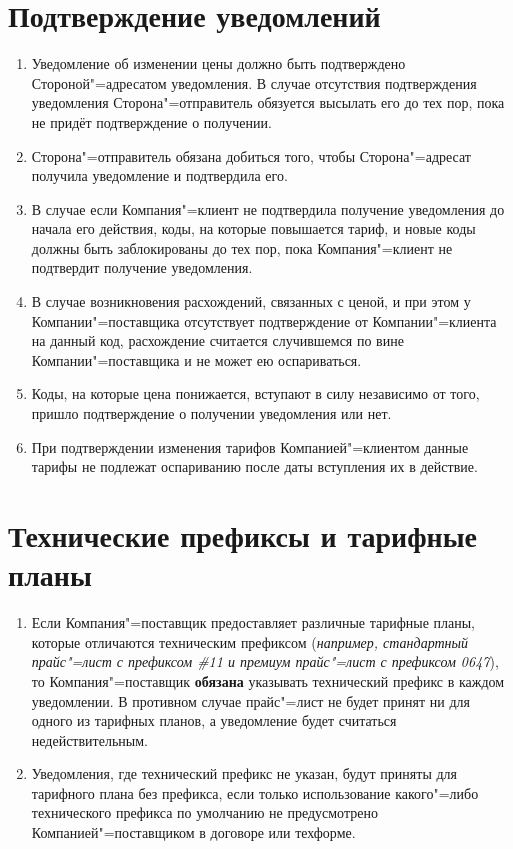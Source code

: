 \begin{Form}
\section{Подтверждение уведомлений} \label{sec:confirmation-ru}
  \begin{enumerate}[label=\thesection.\arabic*.]
   \item Уведомление об изменении цены должно быть подтверждено Стороной"=адресатом уведомления.
         В случае отсутствия подтверждения уведомления Сторона"=отправитель обязуется высылать его
         до тех пор, пока не придёт подтверждение о получении.
    \item  Сторона"=отправитель обязана добиться того, чтобы Сторона"=адресат получила уведомление
           и подтвердила его.
    \item В случае если Компания"=клиент не подтвердила получение уведомления до начала его действия,
          коды, на которые повышается тариф, и новые коды должны быть заблокированы до тех пор,
          пока Компания"=клиент не подтвердит получение уведомления.
    \item В случае возникновения расхождений, связанных с ценой, и при этом у Компании"=поставщика
          отсутствует подтверждение от Компании"=клиента на данный код, расхождение считается
          случившемся по вине Компании"=поставщика и не может ею оспариваться.
    \item Коды, на которые цена понижается, вступают в силу независимо от того, пришло подтверждение
          о получении уведомления или нет.
    \item При подтверждении изменения тарифов Компанией"=клиентом данные тарифы не подлежат оспариванию
          после даты вступления их в действие.
  \end{enumerate}

\section{Технические префиксы и тарифные планы}

  \begin{enumerate}[label=\thesection.\arabic*.]
    \item Если Компания"=поставщик предоставляет различные тарифные планы,
          которые отличаются техническим префиксом (\textit{например, стандартный прайс"=лист
          с префиксом \#11 и премиум прайс"=лист с префиксом 0647}), то Компания"=поставщик
          \textbf{обязана} указывать технический префикс в
          каждом уведомлении. В противном случае прайс"=лист не будет принят ни
          для одного из тарифных планов, а уведомление будет считаться недействительным.
    \item Уведомления, где технический префикс не указан, будут приняты для тарифного плана
          \flqq{}без префикса\frqq{}, если только использование какого"=либо технического префикса
          по умолчанию не предусмотрено Компанией"=поставщиком в договоре или техформе.
  \end{enumerate}


\end{Form}

